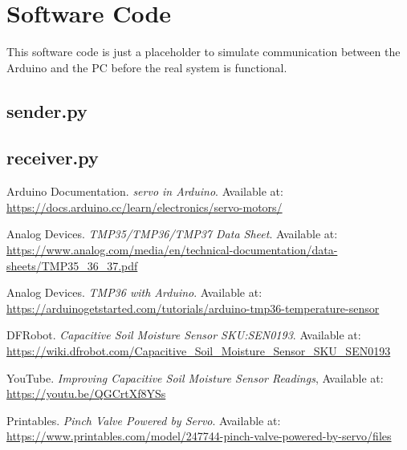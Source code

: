 \documentclass[a4paper,11pt]{article}
\begin{document}
\section{Software Code}

This software code is just a placeholder to simulate
communication between the Arduino and the PC
before the real system is functional.

\subsection{sender.py}



\subsection{receiver.py}



\begin{thebibliography}{9}

Arduino Documentation. \textit{servo in Arduino}. Available at: \url{https://docs.arduino.cc/learn/electronics/servo-motors/}

Analog Devices. \textit{TMP35/TMP36/TMP37 Data Sheet}. Available at: \url{https://www.analog.com/media/en/technical-documentation/data-sheets/TMP35_36_37.pdf}

Analog Devices. \textit{TMP36 with Arduino}. Available at: \url{https://arduinogetstarted.com/tutorials/arduino-tmp36-temperature-sensor}

DFRobot. \textit{Capacitive Soil Moisture Sensor SKU:SEN0193}. Available at: \url{https://wiki.dfrobot.com/Capacitive_Soil_Moisture_Sensor_SKU_SEN0193}

YouTube. \textit{Improving Capacitive Soil Moisture Sensor Readings}, Available at: \url{https://youtu.be/QGCrtXf8YSs}

Printables. \textit{Pinch Valve Powered by Servo}. Available at: \url{https://www.printables.com/model/247744-pinch-valve-powered-by-servo/files}


\end{thebibliography}
\end{document}

